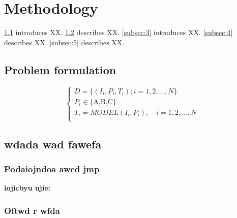 \section{Methodology}
\cref{subsec:1} introduces XX.
\cref{subsec:2} describes XX.
\cref{subsec:3} introduces XX.
\cref{subsec:4} describes XX.
\cref{subsec:5} describes XX.
\subsection{Problem formulation}
\label{subsec:1}
\lipsum[1]
\begin{equation}
  \begin{cases}
  D = \{(I_i, P_i, T_i); i=1,2,\ldots,N\} \\
  P_i \in \{\text{A,B,C}\} \\
  T_i = MODEL(I_i, P_i), \quad i=1,2,\ldots,N \\
  \end{cases}
  \label{eq:1}
\end{equation}
\lipsum[4]
\subsection{wdada wad fawefa}
\label{subsec:2}
\lipsum[4]

\subsubsection{Podaiojndoa awed jmp}
 \lipsum[1]

{\bf iojicbyu ujie:} \lipsum[1]
\subsubsection{Oftwd r wfda }
\lipsum[4]

